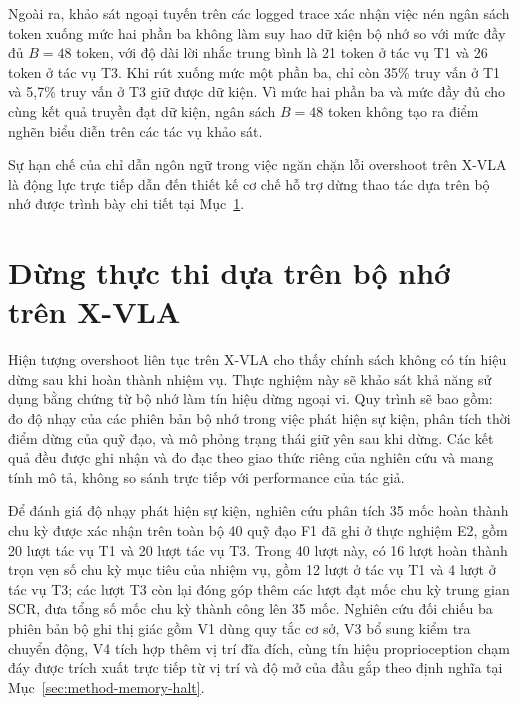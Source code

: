 Ngoài ra, khảo sát ngoại tuyến trên các logged trace xác nhận việc nén ngân sách token xuống mức hai phần ba không làm suy hao dữ kiện bộ nhớ so với mức đầy đủ $B = 48$ token, với độ dài lời nhắc trung bình là 21 token ở tác vụ T1 và 26 token ở tác vụ T3. Khi rút xuống mức một phần ba, chỉ còn 35\% truy vấn ở T1 và 5,7\% truy vấn ở T3 giữ được dữ kiện. Vì mức hai phần ba và mức đầy đủ cho cùng kết quả truyền đạt dữ kiện, ngân sách $B = 48$ token không tạo ra điểm nghẽn biểu diễn trên các tác vụ khảo sát.

Sự hạn chế của chỉ dẫn ngôn ngữ trong việc ngăn chặn lỗi overshoot trên X-VLA là động lực trực tiếp dẫn đến thiết kế cơ chế hỗ trợ dừng thao tác dựa trên bộ nhớ được trình bày chi tiết tại Mục~\ref{sec:memory-halt}.

\section{Dừng thực thi dựa trên bộ nhớ trên X-VLA}
\label{sec:memory-halt}

Hiện tượng overshoot liên tục trên X-VLA cho thấy chính sách không có tín hiệu dừng sau khi hoàn thành nhiệm vụ. Thực nghiệm này sẽ khảo sát khả năng sử dụng bằng chứng từ bộ nhớ làm tín hiệu dừng ngoại vi. Quy trình sẽ bao gồm: đo độ nhạy của các phiên bản bộ nhớ trong việc phát hiện sự kiện, phân tích thời điểm dừng của quỹ đạo, và mô phỏng trạng thái giữ yên sau khi dừng. Các kết quả đều được ghi nhận và đo đạc theo giao thức riêng của nghiên cứu và mang tính mô tả, không so sánh trực tiếp với performance của tác giả.

\label{sec:writer-recall}
Để đánh giá độ nhạy phát hiện sự kiện, nghiên cứu phân tích 35 mốc hoàn thành chu kỳ được xác nhận trên toàn bộ 40 quỹ đạo F1 đã ghi ở thực nghiệm E2, gồm 20 lượt tác vụ T1 và 20 lượt tác vụ T3. Trong 40 lượt này, có 16 lượt hoàn thành trọn vẹn số chu kỳ mục tiêu của nhiệm vụ, gồm 12 lượt ở tác vụ T1 và 4 lượt ở tác vụ T3; các lượt T3 còn lại đóng góp thêm các lượt đạt mốc chu kỳ trung gian SCR, đưa tổng số mốc chu kỳ thành công lên 35 mốc. Nghiên cứu đối chiếu ba phiên bản bộ ghi thị giác gồm V1 dùng quy tắc cơ sở, V3 bổ sung kiểm tra chuyển động, V4 tích hợp thêm vị trí đĩa đích, cùng tín hiệu proprioception chạm đáy được trích xuất trực tiếp từ vị trí và độ mở của đầu gắp theo định nghĩa tại Mục~\ref{sec:method-memory-halt}.

